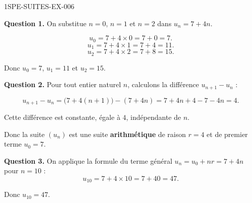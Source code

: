 \begin{corrige}{1SPE-SUITES-EX-006}


\textbf{Question 1.} On substitue $n = 0$, $n = 1$ et $n = 2$ dans $u_n = 7 + 4n$.

\[
u_0 = 7 + 4 \times 0 = 7 + 0 = 7.
\]
\[
u_1 = 7 + 4 \times 1 = 7 + 4 = 11.
\]
\[
u_2 = 7 + 4 \times 2 = 7 + 8 = 15.
\]

Donc $u_0 = 7$, $u_1 = 11$ et $u_2 = 15$.


\textbf{Question 2.} Pour tout entier naturel $n$, calculons la différence $u_{n+1} - u_n$ :

\[
u_{n+1} - u_n = \bigl(7 + 4(n+1)\bigr) - (7 + 4n) = 7 + 4n + 4 - 7 - 4n = 4.
\]

Cette différence est constante, égale à $4$, indépendante de $n$.

Donc la suite $(u_n)$ est une suite \textbf{arithmétique} de raison $r = 4$ et de premier terme $u_0 = 7$.


\textbf{Question 3.} On applique la formule du terme général $u_n = u_0 + nr = 7 + 4n$ pour $n = 10$ :
\[
u_{10} = 7 + 4 \times 10 = 7 + 40 = 47.
\]

Donc $u_{10} = 47$.

\end{corrige}
